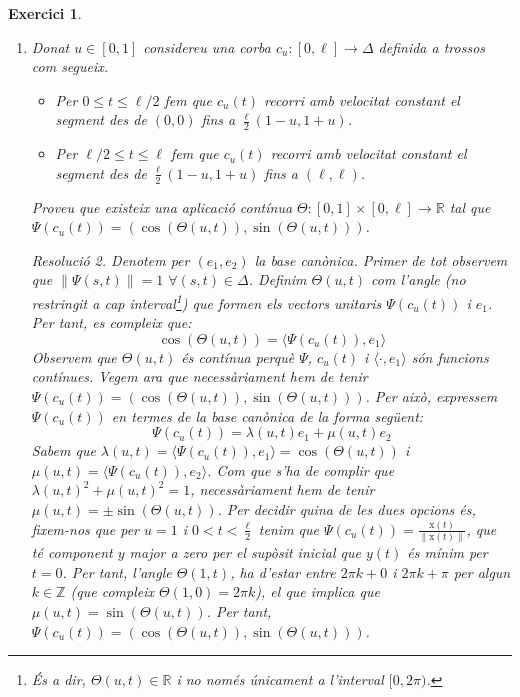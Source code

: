 \documentclass[10pt,a4paper]{article}
\newcommand{\vf}[1]{\boldsymbol{\mathrm{#1}}} %
\newcommand{\RR}{\ensuremath{\mathbb{R}}}
\newcommand{\ZZ}{\ensuremath{\mathbb{Z}}}
\newtheorem{exercice}{Exercici}
\theoremstyle{remark}
\newtheorem*{resolution}{Resolució}
\theoremstyle{math}
\DeclareMathOperator{\Int}{Int} %
\begin{document}
\begin{exercice}
\begin{enumerate}
\begin{resolution}
            L'interpretació geomètrica d'aquesta funció és la següent: $\Psi(s,t)$ dona el vector director unitari que va des de la posició $\vf{x}(s)$ a $\vf{x}(t)$ per a valors $(s,t)\in\Int \Delta$ i l'exten de manera contínua a tot $(s,t)\in \Delta$.
          \end{resolution}
          \item\label{apartat2} Donat $u\in[0,1]$ considereu una corba $c_u:[0,\ell]\rightarrow\Delta$ definida a trossos com segueix.
          \begin{itemize}
            \item Per $0\leq t\leq \ell/2$ fem que $c_u(t)$ recorri amb velocitat constant el segment des de $(0,0)$ fins a $\frac{\ell}{2}(1-u,1+u)$.
            \item Per $\ell/2\leq t\leq \ell$ fem que $c_u(t)$ recorri amb velocitat constant el segment des de $\frac{\ell}{2}(1-u,1+u)$ fins a $(\ell,\ell)$.
          \end{itemize}
          Proveu que existeix una aplicació contínua $\Theta:[0,1]\times[0,\ell]\rightarrow\RR$ tal que $\Psi(c_u(t))=(\cos(\Theta(u,t)),\sin(\Theta(u,t)))$.
          \begin{resolution}
            Denotem per $(e_1,e_2)$ la base canònica. Primer de tot observem que $\|\Psi(s,t)\|=1$ $\forall (s,t)\in\Delta$. Definim $\Theta(u,t)$ com l'angle (no restringit a cap interval\footnote{És a dir, $\Theta(u,t)\in\RR$ i no només únicament a l'interval $[0,2\pi)$.}) que formen els vectors unitaris $\Psi(c_u(t))$ i $e_1$. Per tant, es compleix que: $$\cos(\Theta(u,t))=\langle\Psi(c_u(t)),e_1\rangle$$
            Observem que $\Theta(u,t)$ és contínua perquè $\Psi$, $c_u(t)$ i $\langle\cdot,e_1\rangle$ són funcions contínues. Vegem ara que necessàriament hem de tenir $\Psi(c_u(t))=(\cos(\Theta(u,t)),\sin(\Theta(u,t)))$. Per això, expressem $\Psi(c_u(t))$ en termes de la base canònica de la forma següent: $$\Psi(c_u(t))=\lambda(u,t)e_1+\mu(u,t)e_2$$
            Sabem que $\lambda(u,t)=\langle\Psi(c_u(t)),e_1\rangle=\cos(\Theta(u,t))$ i $\mu(u,t)=\langle\Psi(c_u(t)),e_2\rangle$. Com que s'ha de complir que ${\lambda(u,t)}^2+{\mu(u,t)}^2=1$, necessàriament hem de tenir $\mu(u,t)=\pm\sin(\Theta(u,t))$. Per decidir quina de les dues opcions és, fixem-nos que per $u=1$ i $0<t<\frac{\ell}{2}$ tenim que $\Psi(c_u(t))=\frac{\vf{x}(t)}{\|\vf{x}(t)\|}$, que té component $y$ major a zero per el supòsit inicial que $y(t)$ és mínim per $t= 0$. Per tant, l'angle $\Theta(1,t)$, ha d'estar entre $2\pi k+0$ i $2\pi k+\pi$ per algun $k\in\ZZ$ (que compleix $\Theta(1,0)=2\pi k$), el que implica que $\mu(u,t)=\sin(\Theta(u,t))$. Per tant, $\Psi(c_u(t))=(\cos(\Theta(u,t)),\sin(\Theta(u,t)))$.


\end{resolution}
\end{enumerate}
\end{exercice}
\end{document}

